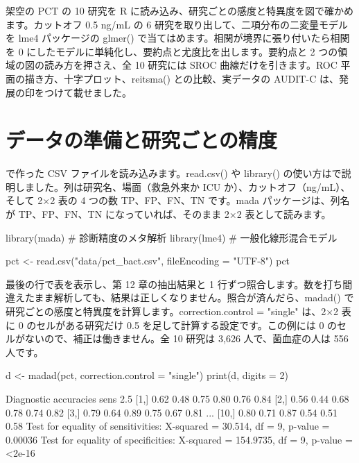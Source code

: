 \begin{chapintro}
架空の PCT の 10 研究を R に読み込み、研究ごとの感度と特異度を図で確かめます。カットオフ 0.5 ng/mL の 6 研究を取り出して、二項分布の二変量モデルを lme4 パッケージの glmer() で当てはめます。相関が境界に張り付いたら相関を 0 にしたモデルに単純化し、要約点と尤度比を出します。要約点と 2 つの領域の図の読み方を押さえ、全 10 研究には SROC 曲線だけを引きます。ROC 平面の描き方、十字プロット、reitsma() との比較、実データの AUDIT-C は、発展の印をつけて載せました。
\end{chapintro}

\section{データの準備と研究ごとの精度}
\label{sec:13-1}

で作った CSV ファイルを読み込みます。read.csv() や library() の使い方はで説明しました。列は研究名、場面（救急外来か ICU か）、カットオフ（ng/mL）、そして 2×2 表の 4 つの数 TP、FP、FN、TN です。mada パッケージは、列名が TP、FP、FN、TN になっていれば、そのまま 2×2 表として読みます。

\begin{rcode}
library(mada)    # 診断精度のメタ解析
library(lme4)    # 一般化線形混合モデル

pct <- read.csv("data/pct_bact.csv",
                fileEncoding = "UTF-8")
pct
\end{rcode}

最後の行で表を表示し、第 12 章の抽出結果と 1 行ずつ照合します。数を打ち間違えたまま解析しても、結果は正しくなりません。照合が済んだら、madad() で研究ごとの感度と特異度を計算します。correction.control = "single" は、2×2 表に 0 のセルがある研究だけ 0.5 を足して計算する設定です。この例には 0 のセルがないので、補正は働きません。全 10 研究は 3,626 人で、菌血症の人は 556 人です。

\begin{rcode}
d <- madad(pct, correction.control = "single")
print(d, digits = 2)
\end{rcode}

\begin{rout}
Diagnostic accuracies
      sens 2.5%
 [1,] 0.62 0.48  0.75 0.80 0.76  0.84
 [2,] 0.56 0.44  0.68 0.78 0.74  0.82
 [3,] 0.79 0.64  0.89 0.75 0.67  0.81
  ...
[10,] 0.80 0.71  0.87 0.54 0.51  0.58
Test for equality of sensitivities:
X-squared = 30.514, df = 9, p-value = 0.00036
Test for equality of specificities:
X-squared = 154.9735, df = 9, p-value = <2e-16
\end{rout}

